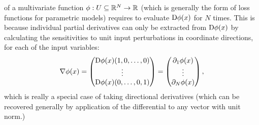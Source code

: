  of a multivariate function
\(\phi: U \subseteq \mathbb{R}^N \to \mathbb{R}\) (which is generally the form of loss functions for parametric
models) requires to evaluate \(\mathop{}\!\mathrm{D} \phi(x)\) for \(N\) times.  This is because individual partial
derivatives can only be extracted from \(\mathop{}\!\mathrm{D} \phi(x)\) by calculating the sensitivities to unit
input perturbations in coordinate directions, for each of the input variables:
\begin{equation}
  \nabla \phi(x) = \begin{pmatrix}
    \mathop{}\!\mathrm{D} \phi(x)(1, 0, \ldots, 0)  \\
    \vdots \\
    \mathop{}\!\mathrm{D} \phi(x)(0, \ldots, 0, 1)
  \end{pmatrix} = \begin{pmatrix}
    \partial_1 \phi(x) \\
    \vdots \\
    \partial_N \phi(x)
  \end{pmatrix},
\end{equation}
which is really a special case of taking directional derivatives (which can be recovered generally
by application of the differential to any vector with unit norm.)

